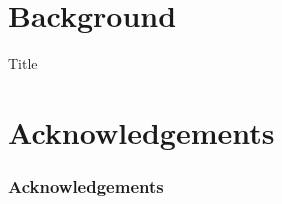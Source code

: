 \makeatletter
\def\beamer@andtitle{\unskip,  }%
\def\beamer@andinst{\\[1pt]}%
\makeatother

\maketitle

\section{Background}


\begin{frame}{Title}

\end{frame}


\section{Acknowledgements}


\begin{frame}
    \frametitle{Acknowledgements}
    \framesubtitle{}
\end{frame}


\bibliographpage

\backmatter
